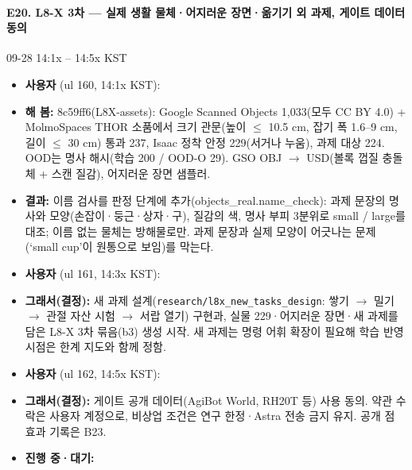 \paragraph{E20. L8-X 3차 --- 실제 생활 물체·어지러운 장면·옮기기 외 과제, 게이트 데이터 동의}
{\small 09-28 14:1x -- 14:5x KST}
\begin{itemize}
  \item \textbf{사용자} (ul 160, 14:1x KST): 
  \item \textbf{해 봄:} 8c59ff6(L8X-assets): Google Scanned Objects 1,033(모두 CC BY 4.0) + MolmoSpaces THOR 소품에서 크기 관문(높이 $\leq$ 10.5 cm, 잡기 폭 1.6--9 cm, 길이 $\leq$ 30 cm) 통과 237, Isaac 정착 안정 229(서거나 누움), 과제 대상 224. OOD는 명사 해시(학습 200 / OOD-O 29). GSO OBJ $\rightarrow$ USD(볼록 껍질 충돌체 + 스캔 질감), 어지러운 장면 샘플러.
  \item \textbf{결과:} 이름 검사를 판정 단계에 추가(objects\_real.name\_check): 과제 문장의 명사와 모양(손잡이·둥근·상자·구), 질감의 색, 명사 부피 3분위로 small / large를 대조; 이름 없는 물체는 방해물로만. 과제 문장과 실제 모양이 어긋나는 문제(`small cup'이 원통으로 보임)를 막는다.
  \item \textbf{사용자} (ul 161, 14:3x KST): 
  \item \textbf{그래서(결정):} 새 과제 설계(\texttt{research/\allowbreak{}l8x\_\allowbreak{}new\_\allowbreak{}tasks\_\allowbreak{}design}: 쌓기 $\rightarrow$ 밀기 $\rightarrow$ 관절 자산 시험 $\rightarrow$ 서랍 열기) 구현과, 실물 229·어지러운 장면·새 과제를 담은 L8-X 3차 묶음(b3) 생성 시작. 새 과제는 명령 어휘 확장이 필요해 학습 반영 시점은 한계 지도와 함께 정함.
  \item \textbf{사용자} (ul 162, 14:5x KST): 
  \item \textbf{그래서(결정):} 게이트 공개 데이터(AgiBot World, RH20T 등) 사용 동의. 약관 수락은 사용자 계정으로, 비상업 조건은 연구 한정·Astra 전송 금지 유지. 공개 점 효과 기록은 B23.
  \item \textbf{진행 중·대기:} 
\end{itemize}
